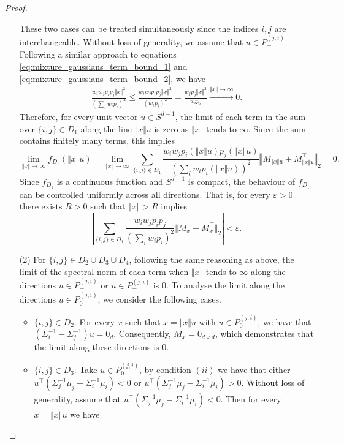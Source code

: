 \begin{proof}
\begin{enumerate}
These two cases can be treated simultaneously since the indices $i, j$ are interchangeable. Without loss of generality, we assume that $u\in P_{+}^{(j, i)}$. Following a similar approach to equations \eqref{eq:mixture_gaussians_term_bound_1} and \eqref{eq:mixture_gaussians_term_bound_2}, we have 
    \begin{align*}
        \frac{ w_iw_j p_i p_j  \Vert x\Vert^2}{(\sum_i w_i p_i)^2}\leq \frac{ w_iw_j p_i p_j \Vert x\Vert^2}{(w_i p_i)^2} =\frac{ w_j p_j  \Vert x\Vert^2}{w_i p_i} \xrightarrow{\Vert x\Vert \to \infty} 0.
    \end{align*}
Therefore, for every unit vector $u\in S^{d-1}$, the limit of each term in the sum over $\{i, j\}\in D_1$  along the line $\Vert x\Vert u$ is zero as $\Vert x\Vert$ tends to $\infty$. Since the sum contains finitely many terms, this implies  
\begin{equation*}
    \lim_{\Vert x\Vert\to\infty} f_{D_1}(\Vert x\Vert u) = \lim_{\Vert x\Vert\to\infty}\sum_{\{i, j\}\in D_1}\frac{ w_iw_j p_i(\Vert x\Vert u) p_j(\Vert x\Vert u)}{(\sum_i w_i p_i(\Vert x\Vert u))^2}\left\Vert M_{\Vert x\Vert u} + M_{\Vert x\Vert u}^{\intercal} \right\Vert_2  = 0.
\end{equation*}
Since $f_{D_1}$ is a continuous function and $S^{d-1}$ is compact, the behaviour of $f_{D_1}$ can be controlled uniformly across all directions. That is, for every $\varepsilon>0$ there exists $R>0$ such that $\Vert x\Vert>R$ implies
\begin{equation*}
    \left\vert\sum_{\{i, j\}\in D_1}\frac{ w_iw_j p_i p_j }{(\sum_i w_i p_i)^2}\Vert M_x + M_x^{\intercal} \Vert_2\right\vert  <\varepsilon.
\end{equation*}
\item[(2)] For $\{i,j\}\in D_2\cup D_3 \cup D_4$, following the same reasoning as above, the limit of the spectral norm of each term when $\Vert x\Vert$ tends to $\infty$ along the directions $u\in P_{+}^{(j, i)}$ or $u\in P_{-}^{(j, i)}$ is $0$. 
To analyse the limit along the directions $u\in P_{0}^{(j, i)}$, we consider the following cases.
\begin{itemize}
    \item $\{i, j\} \in D_2$. For every $x$ such that $x = \Vert x\Vert u$ with $u\in P_{0}^{(j, i)}$, we have that $\left(\Sigma_i^{-1}-\Sigma_j^{-1}\right) u = 0_d$. Consequently, $M_x = 0_{d\times d}$, which demonstrates that the limit along these directions is $0$.
    \item $\{i, j\} \in D_3$. Take $u\in P_{0}^{(j, i)}$, by condition $(ii)$ we have that either $u^\intercal\left(\Sigma_j^{-1}\mu_j-\Sigma_i^{-1}\mu_i\right)<0$ or $u^\intercal\left(\Sigma_j^{-1}\mu_j-\Sigma_i^{-1}\mu_i\right)> 0$. Without loss of generality, assume that $u^\intercal\left(\Sigma_j^{-1}\mu_j-\Sigma_i^{-1}\mu_i\right)< 0$. Then for every $x = \Vert x\Vert u$ we have

\end{itemize}
\end{enumerate}
\end{proof}
